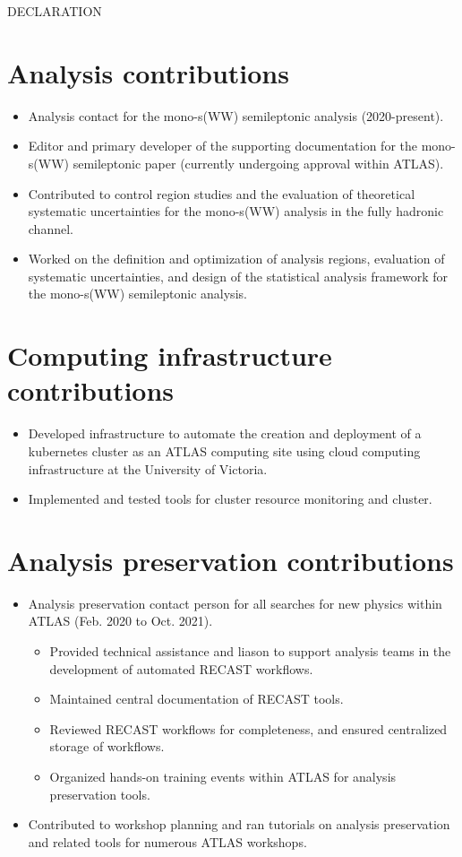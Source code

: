 \begin{center}
DECLARATION
\end{center}

\section*{Analysis contributions}

\begin{itemize}
\item Analysis contact for the mono-s(WW) semileptonic analysis (2020-present).
\item Editor and primary developer of the supporting documentation for the mono-s(WW) semileptonic paper (currently undergoing approval within ATLAS).
\item Contributed to control region studies and the evaluation of theoretical systematic uncertainties for the mono-s(WW) analysis in the fully hadronic channel.
\item Worked on the definition and optimization of analysis regions, evaluation of systematic uncertainties, and design of the statistical analysis framework for the mono-s(WW) semileptonic analysis.
\end{itemize}

\section*{Computing infrastructure contributions}
\begin{itemize}
\item Developed infrastructure to automate the creation and deployment of a kubernetes cluster as an ATLAS computing site using cloud computing infrastructure at the University of Victoria.
\item Implemented and tested tools for cluster resource monitoring and cluster. 
\end{itemize}

\section*{Analysis preservation contributions}
\begin{itemize}
\item Analysis preservation contact person for all searches for new physics within ATLAS (Feb. 2020 to Oct. 2021).
\begin{itemize}
\item Provided technical assistance and liason to support analysis teams in the development of automated RECAST workflows.
\item Maintained central documentation of RECAST tools.
\item Reviewed RECAST workflows for completeness, and ensured centralized storage of workflows.
\item Organized hands-on training events within ATLAS for analysis preservation tools.
\end{itemize}
\item Contributed to workshop planning and ran tutorials on analysis preservation and related tools for numerous ATLAS workshops.
\end{itemize}